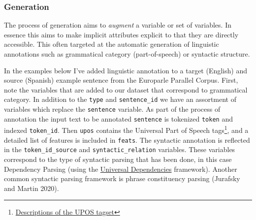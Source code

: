 \documentclass[
  letterpaper,
]{latex/krantz}
\begin{document}
\hypertarget{generation}{%
\subsubsection{Generation}\label{generation}}

The process of generation aims to \emph{augment} a variable or set of
variables. In essence this aims to make implicit attributes explicit to
that they are directly accessible. This often targeted at the automatic
generation of linguistic annotations such as grammatical category
(part-of-speech) or syntactic structure.

In the examples below I've added linguistic annotation to a target
(English) and source (Spanish) example sentence from the Europarle
Parallel Corpus. First, note the variables that are added to our dataset
that correspond to grammatical category. In addition to the
\texttt{type} and \texttt{sentence\_id} we have an assortment of
variables which replace the \texttt{sentence} variable. As part of the
process of annotation the input text to be annotated \texttt{sentence}
is tokenized \texttt{token} and indexed \texttt{token\_id}. Then
\texttt{upos} contains the Universal Part of Speech tags\footnote{\href{https://universaldependencies.org/u/pos/}{Descriptions
  of the UPOS tagset}}, and a detailed list of features is included in
\texttt{feats}. The syntactic annotation is reflected in the
\texttt{token\_id\_source} and \texttt{syntactic\_relation} variables.
These variables correspond to the type of syntactic parsing that has
been done, in this case Dependency Parsing (using the
\href{https://universaldependencies.org/}{Universal Dependencies}
framework). Another common syntactic parsing framework is phrase
constituency parsing (Jurafsky and Martin 2020).
\end{document}
